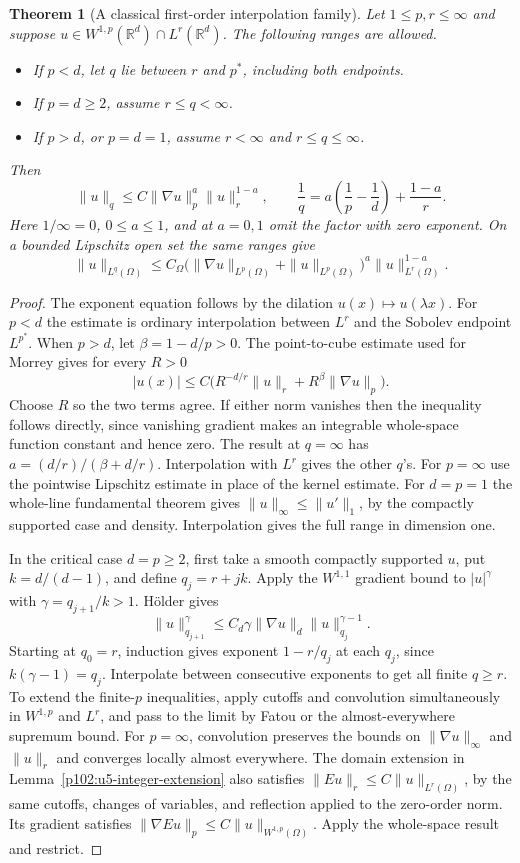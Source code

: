 \documentclass[11pt,oneside,openany]{book}
\newtheorem{theorem}{Theorem}[chapter]
\theoremstyle{definition}
\theoremstyle{remark}
\begin{document}
\begin{theorem}[A classical first-order interpolation family]
\label{p102:U5-02}
Let \(1\le p,r\le\infty\) and suppose
\(u\in W^{1,p}(\mathbb R^d)\cap L^r(\mathbb R^d)\).
The following ranges are allowed.
\begin{itemize}
\item If \(p<d\), let \(q\) lie between \(r\) and \(p^*\), including both endpoints.
\item If \(p=d\ge2\), assume \(r\le q<\infty\).
\item If \(p>d\), or \(p=d=1\), assume \(r<\infty\) and \(r\le q\le\infty\).
\end{itemize}
Then
\[
 \|u\|_q\le C\|\nabla u\|_p^a\|u\|_r^{1-a},
 \qquad
 \frac1q=a\left(\frac1p-\frac1d\right)+\frac{1-a}{r}.
\]
Here \(1/\infty=0\), \(0\le a\le1\), and at \(a=0,1\) omit the
factor with zero exponent. On a bounded Lipschitz open set the same ranges give
\[
 \|u\|_{L^q(\Omega)}
 \le C_\Omega
   \bigl(\|\nabla u\|_{L^p(\Omega)}+\|u\|_{L^p(\Omega)}\bigr)^a
   \|u\|_{L^r(\Omega)}^{1-a}.
\]
\end{theorem}
\begin{proof}
The exponent equation follows by the dilation \(u(x)\mapsto u(\lambda x)\).
For \(p<d\) the estimate is ordinary interpolation between \(L^r\) and
the Sobolev endpoint \(L^{p^*}\). When \(p>d\), let
\(\beta=1-d/p>0\). The point-to-cube estimate used for Morrey gives
for every \(R>0\)
\[
 |u(x)|\le C \bigl(R^{-d/r}\|u\|_r+R^\beta\|\nabla u\|_p\bigr).
\]
Choose \(R\) so the two terms agree. If either norm vanishes then the
inequality follows directly, since vanishing gradient makes an
integrable whole-space function constant and hence zero. The result
at \(q=\infty\) has \(a=(d/r)/(\beta+d/r)\). Interpolation with
\(L^r\) gives the other \(q\)'s. For \(p=\infty\) use the pointwise
Lipschitz estimate in place of the kernel estimate. For \(d=p=1\)
the whole-line fundamental theorem gives
\(\|u\|_\infty\le\|u'\|_1\), by the compactly supported case
and density. Interpolation gives the full range in dimension one.

In the critical case \(d=p\ge2\), first take a smooth compactly
supported \(u\), put \(k=d/(d-1)\), and define \(q_j=r+jk\).
Apply the \(W^{1,1}\) gradient bound to \(|u|^\gamma\) with
\(\gamma=q_{j+1}/k>1\). H\"older gives
\[
 \|u\|_{q_{j+1}}^\gamma\le
 C_d\gamma\|\nabla u\|_d\|u\|_{q_j}^{\gamma-1}.
\]
Starting at \(q_0=r\), induction gives exponent \(1-r/q_j\) at
each \(q_j\), since \(k(\gamma-1)=q_j\).
Interpolate between consecutive exponents to get all finite
\(q\ge r\). To extend the finite-\(p\) inequalities, apply cutoffs
and convolution simultaneously in \(W^{1,p}\) and \(L^r\), and
pass to the limit by Fatou or the almost-everywhere supremum bound.
For \(p=\infty\), convolution preserves the bounds on \(\|\nabla
u\|_\infty\) and \(\|u\|_r\) and converges locally almost everywhere.
The domain extension in Lemma~\ref{p102:u5-integer-extension} also
satisfies \(\|Eu\|_r\le C\|u\|_{L^r(\Omega)}\), by the same
cutoffs, changes of variables, and reflection applied to the
zero-order norm. Its gradient satisfies
\(\|\nabla Eu\|_p\le C\|u\|_{W^{1,p}(\Omega)}\).
Apply the whole-space result and restrict.
\end{proof}
\end{document}
